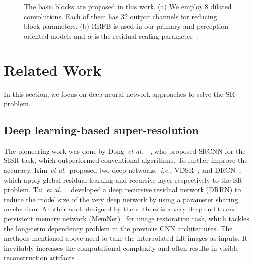 \documentclass[preprint]{elsarticle}
\newcommand{\etal}{\textit{et al.~}}
\newcommand{\ie}{\textit{i.e.}}
\begin{document}
\begin{figure*}[htpb]
	\begin{center}
		\hfil
		\caption{The basic blocks are proposed in this work. (a) We employ 8 dilated convolutions. Each of them has 32 output channels for reducing block parameters. (b) RRFB is used in our primary and perception-oriented models and $\alpha$ is the residual scaling parameter~\cite{EDSR,ESRGAN}.}
		\label{fig:block}
	\end{center}
\end{figure*}

\section{Related Work}\label{sec:related-work}
In this section, we focus on deep neural network approaches to solve the SR problem.
\subsection{Deep learning-based super-resolution}
The pioneering work was done by Dong~\etal~\cite{SRCNN,SRCNN-Ex}, who proposed SRCNN for the SISR task, which outperformed conventional algorithms. To further improve the accuracy, Kim~\etal proposed two deep networks,~\ie, VDSR~\cite{VDSR}, and DRCN~\cite{DRCN}, which apply global residual learning and recursive layer respectively to the SR problem. Tai~\etal~\cite{DRRN} developed a deep recursive residual network (DRRN) to reduce the model size of the very deep network by using a parameter sharing mechanism. Another work designed by the authors is a very deep end-to-end persistent memory network (MemNet)~\cite{MemNet} for image restoration task, which tackles the long-term dependency problem in the previous CNN architectures. The methods mentioned above need to take the interpolated LR images as inputs. It inevitably increases the computational complexity and often results in visible reconstruction artifacts~\cite{LapSRN}.
\end{document}
